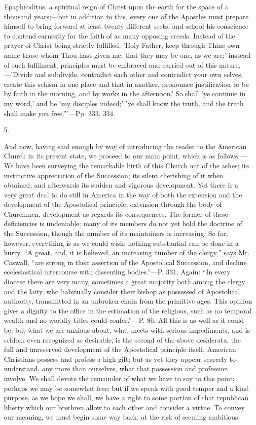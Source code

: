 Epaphroditus, a spiritual reign of Christ upon the earth for the space
of a thousand years;—but in addition to this, every one of the
Apostles must prepare himself to bring forward at least twenty
different sects, and school his conscience to contend earnestly for
the faith of as many opposing creeds. Instead of the prayer of Christ
being strictly fulfilled, 'Holy Father, keep through Thine own name
those whom Thou hast given me, that they may be one, as we are;'
instead of such fulfilment, principles must be embraced and carried
out of this nature,—'Divide and subdivide, contradict each other and
contradict your own selves, create this schism in one place and that
in another, pronounce justification to be by faith in the morning, and
by works in the afternoon.' So shall 'ye continue in my word,' and be
'my disciples indeed;' 'ye shall know the truth, and the truth shall
make you free.'''—Pp. 333, 334.

5.

And now, having said enough by way of introducing
the reader to the American Church in its present state, we proceed to
our main point, which is as follows:—We have been surveying
the remarkable birth of this Church out of the ashes; its instinctive
appreciation of the Succession; its silent cherishing of it when
obtained; and afterwards its sudden and vigorous development. Yet there
is a very great deal to do still in America in the way of both the
extension and the development of the Apostolical principle; extension
through the body of Churchmen, development as regards its
consequences. The former of these deficiencies is undeniable; many of
its members do not yet hold the doctrine of the Succession, though the
number of its maintainers is increasing. So far, however, everything
is as we could wish; nothing substantial can be done in a hurry. ``A
great, and, it is believed, an increasing number of the clergy,'' says
Mr. Caswall, ``are strong in their assertion of the Apostolical
Succession, and decline ecclesiastical intercourse with dissenting
bodies.''—P. 331. Again: ``In every diocese there are very many,
sometimes a great majority both among the clergy and the laity, who
habitually consider their bishop as possessed of Apostolical
authority, transmitted in an unbroken chain from the primitive ages.
This opinion gives a dignity to the office in the estimation of the
religious, such as no temporal wealth and no worldly titles could
confer.''—P. 86. All this is as well as it could be; but what we are
anxious about, what meets with serious impediments, and is seldom even
recognized as desirable, is the second of the above desiderata, the
full and unreserved development of the Apostolical principle itself.
American Christians possess and profess a high gift; but as yet they
appear scarcely to understand, any more than ourselves, what that
possession and profession involve. We shall devote the remainder of
what we have to say to this point; perhaps we may be somewhat free;
but if we speak with good temper and a kind purpose, as we hope
we shall, we have a right to some portion of that republican liberty
which our brethren allow to each other and consider a virtue. To
convey our meaning, we must begin some way back, at the risk of
seeming ambitious.

